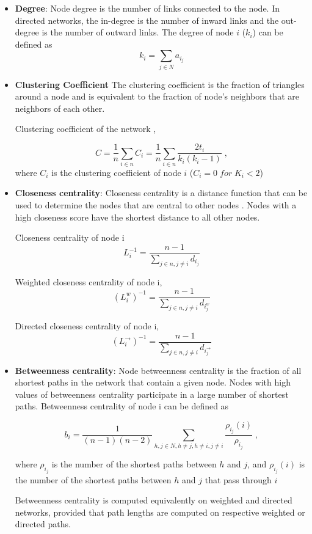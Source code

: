 \begin{itemize}

\item \textbf{Degree}: Node degree is the number of links connected to the node. In directed networks, the in-degree is the number of inward links and the out-degree is the number of outward links. The degree of node $i$ ($k_i$) can be defined as  
\[k_i = \sum_{j \in N} a_i_j \] 

\item \textbf{Clustering Coefficient}
 The clustering coefficient is the fraction of triangles around a node and is equivalent to the fraction of node’s neighbors that are neighbors of each other.
 
 Clustering coefficient of the network \citep{watts1998collective} ,
 
 \[ C = \frac{1}{n} \sum_{i \in n} C_i = \frac{1}{n} \sum_{i \in n} \frac{2t_i}{k_i(k_i-1)} \;, \]
 where $C_i$ is the clustering coefficient of node $i$ ($C_i = 0 \; for \;  K_i < 2$)

 
 
 


\item \textbf{Closeness centrality}: Closeness centrality is a distance function that can be used to determine the nodes that are central to other nodes \citep{freeman1978centrality}. Nodes with a high closeness score have the shortest distance to all other nodes.

Closeness centrality of node i 
\[ L_i^{-1} = \frac{n-1}{\sum_{j \in n, j \ne i}d_i_j}\]

Weighted closeness centrality of node i,
\[( L_i^w)^{-1} = \frac{n-1}{\sum_{j \in n, j \ne i}d_i_j^w}\]

Directed closeness centrality of node i,
\[( L_i^{\rightarrow})^{-1} = \frac{n-1}{\sum_{j \in n, j \ne i}d_i_j^{\rightarrow}}\]

\item \textbf{Betweenness centrality}: Node betweenness centrality is the fraction of all shortest paths in the network that contain a given node. Nodes with high values of betweenness centrality participate in a large number of shortest paths. Betweenness centrality of node i can be defined as

\[ b_i = \frac{1}{(n-1)(n-2)} \sum_{h,j \in N, h \ne j, h \ne i, j \ne i} \frac{\rho_i_j(i)}{\rho_i_j} \; ,  \]

where  $\rho_i_j$ is the number of the shortest paths between $h$ and $j$, and $\rho_i_j(i)$ is the number of the shortest paths between $h$ and $j$ that pass through $i$

Betweenness centrality is computed equivalently on weighted and directed networks, provided that path lengths are computed on respective weighted or directed paths.

\end{itemize}